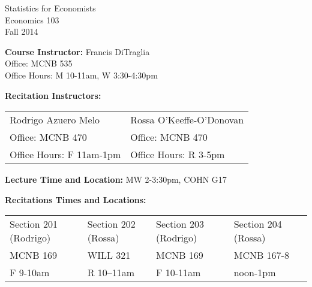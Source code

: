 \documentclass[11pt, letterpaper]{article}
\begin{document}
\thispagestyle{plain}

\begin{center}
\Large
\sc
Statistics for Economists\\
\large
Economics 103\\
\large
Fall 2014\\
\end{center}


\normalsize

\noindent \textbf{Course Instructor:} Francis DiTraglia \\
Office: MCNB 535\\
Office Hours: M 10-11am, W 3:30-4:30pm

\medskip


\noindent \textbf{Recitation Instructors:}

\medskip
\noindent


\begin{tabular}{ll}
Rodrigo Azuero Melo & Rossa O'Keeffe-O'Donovan\\
Office: MCNB 470 & Office: MCNB 470\\ 
Office Hours: F 11am-1pm & Office Hours: R 3-5pm\\
\end{tabular}

\medskip


 
\noindent \textbf{Lecture Time and Location:} MW 2-3:30pm, COHN G17  

\medskip

\noindent \textbf{Recitations Times and Locations:}
\medskip \noindent

\begin{tabular}{lllll}
	Section 201 (Rodrigo) & Section 202 (Rossa) & Section 203 (Rodrigo) & Section 204 (Rossa)\\
	MCNB 169 & WILL 321 & MCNB 169 & MCNB 167-8 \\ 
	F 9-10am & R 10--11am & F 10-11am & noon-1pm
\end{tabular}
\end{document}
